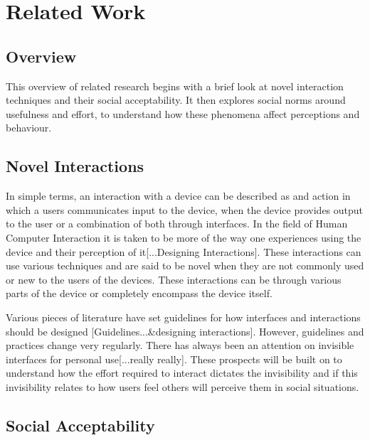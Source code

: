 \documentclass{l4proj}
\begin{document}
\chapter{Related Work}
\section{Overview}

This overview of related research begins with a brief look at novel interaction techniques and their social acceptability. It then explores social norms around usefulness and effort, to understand how these phenomena affect perceptions and behaviour.

\section{Novel Interactions}

In simple terms, an interaction with a device can be described as and action in which a users communicates input to the device, when the device provides output to the user or a combination of both through interfaces. In the field of Human Computer Interaction it is taken to be more of the way one experiences using the device and their perception of it[...Designing Interactions]. These interactions can use various techniques and are said to be novel when they are not commonly used or new to the users of the devices. These interactions can be through various parts of the device or completely encompass the device itself. 

Various pieces of literature have set guidelines for how interfaces and interactions should be designed [Guidelines...&designing interactions]. However, guidelines and practices change very regularly. There has always been an attention on invisible interfaces for personal use[...really really]. These prospects will be built on to understand how the effort required to interact dictates the invisibility and if this invisibility relates to how users feel others will perceive them in social situations.

\section{Social Acceptability}
\end{document}
